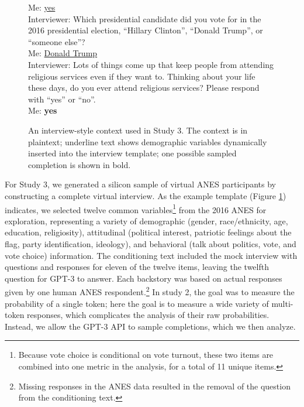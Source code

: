 \documentclass[11pt]{article}
\begin{document}
\begin{figure}
\begin{mdframed}
{{Me: \underline{yes}\\
Interviewer: Which presidential candidate did you vote for in the 2016 presidential election, ``Hillary Clinton'', ``Donald Trump'', or ``someone else''?\\
Me: \underline{Donald Trump}\\
Interviewer: Lots of things come up that keep people from attending religious services even if they want to. Thinking about your life these days, do you ever attend religious services? Please respond with ``yes'' or ``no''.\\
Me: \textbf{yes}
}}
\end{mdframed}
\caption{An interview-style context used in Study 3. The context is in plaintext; underline text shows demographic variables dynamically inserted into the interview template; one possible sampled completion is shown in bold.}%
\label{fig:interview_example}
\end{figure}

For Study 3, we generated a silicon sample of virtual ANES participants by constructing a complete virtual interview. As the example template (Figure \ref{fig:interview_example}) indicates, we selected twelve common variables\footnote{Because vote choice is conditional on vote turnout, these two items are combined into one metric in the analysis, for a total of 11 unique items.} from the 2016 ANES for exploration, representing a variety of demographic (gender, race/ethnicity, age, education, religiosity), attitudinal (political interest, patriotic feelings about the flag, party identification, ideology), and behavioral (talk about politics, vote, and vote choice) information. The conditioning text included the mock interview with questions and responses for eleven of the twelve items, leaving the twelfth question for GPT-3 to answer. Each backstory was based on actual responses given by one human ANES respondent.\footnote{Missing responses in the ANES data resulted in the removal of the question from the conditioning text.} In study 2, the goal was to measure the probability of a single token; here the goal is to measure a wide variety of multi-token responses, which complicates the analysis of their raw probabilities.  Instead, we allow the GPT-3 API to sample completions, which we then analyze.
\end{document}
